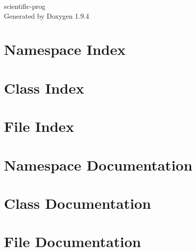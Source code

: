 \documentclass[twoside]{book}
\newcommand{\+}{\discretionary{\mbox{\scriptsize$\hookleftarrow$}}{}{}}
\newcommand{\clearemptydoublepage}{%
    \newpage{\pagestyle{empty}\cleardoublepage}%
  }
\begin{document}
  \raggedbottom
    \hypersetup{pageanchor=false,
                bookmarksnumbered=true,
                pdfencoding=unicode
               }
  \begin{titlepage}
  \vspace*{7cm}
  \begin{center}%
  {\Large scientific-\/prog}\\
  \vspace*{1cm}
  {\large Generated by Doxygen 1.9.4}\\
  \end{center}
  \end{titlepage}
  \clearemptydoublepage
  \tableofcontents
  \clearemptydoublepage
  \hypersetup{pageanchor=true}
\chapter{Namespace Index}

\chapter{Class Index}

\chapter{File Index}

\chapter{Namespace Documentation}

\chapter{Class Documentation}





\chapter{File Documentation}




















  \backmatter
  \newpage
  \clearemptydoublepage
  \printindex
\end{document}
